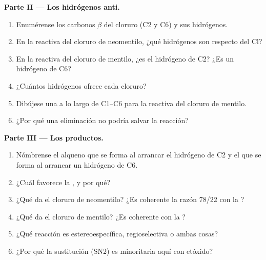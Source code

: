 \begin{problem}
\medskip
\noindent\textbf{Parte II --- Los hidrógenos anti.}
\begin{enumerate}[resume]
  \item Enumérense los carbonos $\beta$ del cloruro (C2 y C6) y sus
        hidrógenos.
  \item En la  reactiva del cloruro de neomentilo, ¿qué hidrógenos son
         respecto del Cl?
  \item En la  reactiva del cloruro de mentilo, ¿es  el hidrógeno
        de C2? ¿Es  un hidrógeno de C6?
  \item ¿Cuántos hidrógenos  ofrece cada cloruro?
  \item Dibújese una  a lo largo de C1--C6 para la
         reactiva del cloruro de mentilo.
  \item ¿Por qué una eliminación  no podría salvar la
        reacción?
\end{enumerate}

\medskip
\noindent\textbf{Parte III --- Los productos.}
\begin{enumerate}[resume]
  \item Nómbrense el alqueno que se forma al arrancar el hidrógeno de C2 y
        el que se forma al arrancar un hidrógeno de C6.
  \item ¿Cuál favorece la , y por qué?
  \item ¿Qué da el cloruro de neomentilo? ¿Es coherente la razón 78/22 con
        la ?
  \item ¿Qué da el cloruro de mentilo? ¿Es coherente con la ?
  \item ¿Qué reacción es estereoespecífica, regioselectiva o ambas cosas?
  \item ¿Por qué la sustitución (SN2) es minoritaria aquí con etóxido?
\end{enumerate}


\end{problem}
